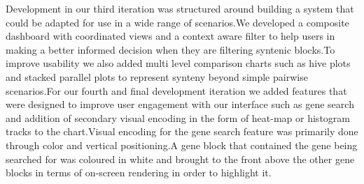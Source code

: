 Development in our third iteration was structured around building a system that could be adapted for use in a wide range of scenarios.We developed a composite dashboard with coordinated views and a context aware filter to help users in making a better informed decision when they are filtering syntenic blocks.To improve usability we also added multi level comparison charts such as hive plots and stacked parallel plots to represent synteny beyond simple pairwise scenarios.For our fourth and final development iteration we added features that were designed to improve user engagement with our interface such as gene search and addition of secondary visual encoding in the form of heat-map or histogram tracks to the chart.Visual encoding for the gene search feature was primarily done through color and vertical positioning.A gene block that contained the gene being searched for was coloured in white and brought to the front above the other gene blocks in terms of on-screen rendering in order to highlight it.